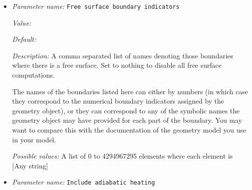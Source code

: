 \begin{itemize}
{\it Value:} 


{\it Default:} 


{\it Description:} A comma separated list of names denoting those boundaries on which the temperature is fixed and described by the boundary temperature object selected in its own section of this input file. All boundary indicators used by the geometry but not explicitly listed here will end up with no-flux (insulating) boundary conditions.

The names of the boundaries listed here can either by numbers (in which case they correspond to the numerical boundary indicators assigned by the geometry object), or they can correspond to any of the symbolic names the geometry object may have provided for each part of the boundary. You may want to compare this with the documentation of the geometry model you use in your model.

This parameter only describes which boundaries have a fixed temperature, but not what temperature should hold on these boundaries. The latter piece of information needs to be implemented in a plugin in the BoundaryTemperature group, unless an existing implementation in this group already provides what you want.


{\it Possible values:} A list of 0 to 4294967295 elements where each element is [Any string]
\item {\it Parameter name:} {\tt Free surface boundary indicators}
\label{parameters:Model settings/Free surface boundary indicators}


{\it Value:} 


{\it Default:} 


{\it Description:} A comma separated list of names denoting those boundaries where there is a free surface. Set to nothing to disable all free surface computations.

The names of the boundaries listed here can either by numbers (in which case they correspond to the numerical boundary indicators assigned by the geometry object), or they can correspond to any of the symbolic names the geometry object may have provided for each part of the boundary. You may want to compare this with the documentation of the geometry model you use in your model.


{\it Possible values:} A list of 0 to 4294967295 elements where each element is [Any string]
\item {\it Parameter name:} {\tt Include adiabatic heating}
\label{parameters:Model settings/Include adiabatic heating}



\end{itemize}
